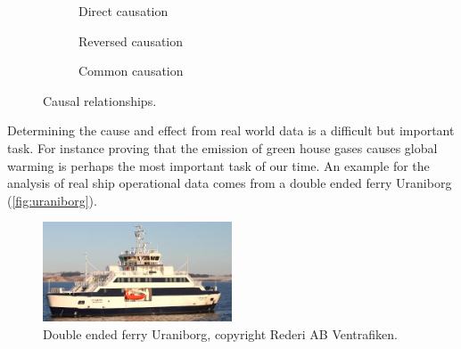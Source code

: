 \documentclass[fleqn,10pt]{olplainarticle}
\begin{document}
\begin{figure}[!htb]
    \begin{subfigure}[b]{0.3\textwidth}
        \centering
        \caption{Direct causation}
        \label{fig:direct_causation}
    \end{subfigure}
    \hfill
    \begin{subfigure}[b]{0.3\textwidth}
        \centering
        \caption{Reversed causation}
        \label{fig:reversed_causation}
    \end{subfigure}
    \hfill
    \begin{subfigure}[b]{0.3\textwidth}
        \centering
        \caption{Common causation}
        \label{fig:common_causation}
    \end{subfigure}
    \caption{Causal relationships.}
    \label{fig:causal_relationships}
    
\end{figure}
Determining the cause and effect from real world data is a difficult but important task. For instance proving that the emission of green house gases causes global warming is perhaps the most important task of our time. 
An example for the analysis of real ship operational data comes from a double ended ferry Uraniborg (\autoref{fig:uraniborg}). 
\begin{figure}[!htb]
    \centering
    \includegraphics[width=0.5\textwidth]{figures/uraniborg.png}
    \caption{Double ended ferry Uraniborg, copyright Rederi AB Ventrafiken.}
    \label{fig:uraniborg}
\end{figure}
\end{document}
